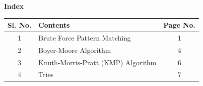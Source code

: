 \begingroup

\thispagestyle{empty}
\centering
{\LARGE \textbf{Index}}

\vspace{1cm}
\renewcommand{\arraystretch}{1.5}

\begin{center}
\begin{tabular}{|c|p{9cm}|c|}
\hline
\textbf{Sl. No.} & \textbf{Contents} & \textbf{Page No.}\\
\hline
1 & Brute Force Pattern Matching & 1\\
\hline
2 & Boyer-Moore Algorithm & 4\\
\hline
3 & Knuth-Morris-Pratt (KMP) Algorithm & 6\\
\hline
4 & Tries & 7\\
\hline
\end{tabular}
\end{center}

\vfill

\endgroup
\newpage
